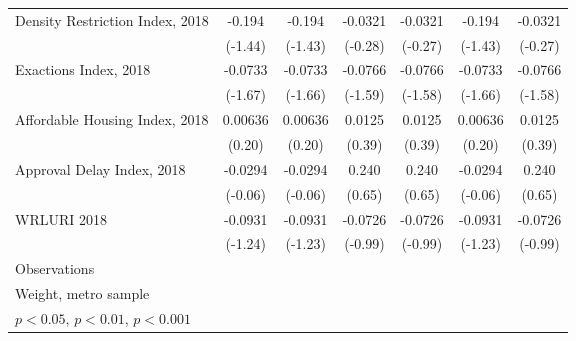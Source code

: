 \begin{table}[htbp]
\begin{tabular}{l*{6}{c}}
Density Restriction Index, 2018&      -0.194         &      -0.194         &     -0.0321         &     -0.0321         &      -0.194         &     -0.0321         \\
                    &     (-1.44)         &     (-1.43)         &     (-0.28)         &     (-0.27)         &     (-1.43)         &     (-0.27)         \\
\addlinespace
Exactions Index, 2018&     -0.0733         &     -0.0733         &     -0.0766         &     -0.0766         &     -0.0733         &     -0.0766         \\
                    &     (-1.67)         &     (-1.66)         &     (-1.59)         &     (-1.58)         &     (-1.66)         &     (-1.58)         \\
\addlinespace
Affordable Housing Index, 2018&     0.00636         &     0.00636         &      0.0125         &      0.0125         &     0.00636         &      0.0125         \\
                    &      (0.20)         &      (0.20)         &      (0.39)         &      (0.39)         &      (0.20)         &      (0.39)         \\
\addlinespace
Approval Delay Index, 2018&     -0.0294         &     -0.0294         &       0.240         &       0.240         &     -0.0294         &       0.240         \\
                    &     (-0.06)         &     (-0.06)         &      (0.65)         &      (0.65)         &     (-0.06)         &      (0.65)         \\
\addlinespace
WRLURI 2018         &     -0.0931         &     -0.0931         &     -0.0726         &     -0.0726         &     -0.0931         &     -0.0726         \\
                    &     (-1.24)         &     (-1.23)         &     (-0.99)         &     (-0.99)         &     (-1.23)         &     (-0.99)         \\
\midrule
Observations        &                     &                     &                     &                     &                     &                     \\
\bottomrule
\multicolumn{7}{l}{\footnotesize Weight, metro sample}\\
\multicolumn{7}{l}{\footnotesize \sym{*} \(p<0.05\), \sym{**} \(p<0.01\), \sym{***} \(p<0.001\)}\\
\end{tabular}
\end{table}
